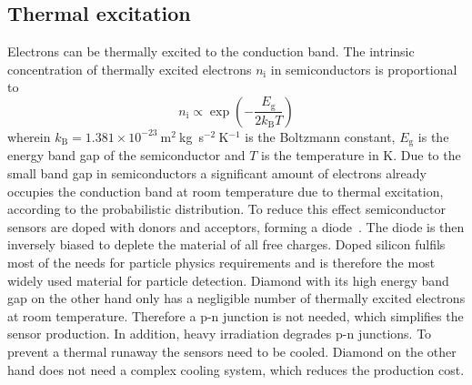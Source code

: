 \subsection{Thermal excitation}
Electrons can be thermally excited to the conduction band. The intrinsic concentration of thermally excited electrons $n_\mathrm{i}$ in semiconductors is proportional to~\cite{PHSEM:00000}
\begin{equation}
\label{eq:intrinsiccarrier}
n_\mathrm{i} \propto \exp\left(-\frac{E_\mathrm{g}}{2k_\mathrm{B}T}\right)
\end{equation} 
wherein $k_\mathrm{B} = 1.381\times10^{-23}~$m$^2~$kg~s$^{-2}~$K$^{-1}$ is the Boltzmann constant, $E_\mathrm{g}$ is the energy band gap of the semiconductor and $T$ is the temperature in K.
Due to the small band gap in semiconductors a significant amount of electrons already occupies the conduction band at room temperature due to thermal excitation, according to the probabilistic distribution. To reduce this effect semiconductor sensors are doped with donors and acceptors, forming a diode~\cite{PHSEM:00000}. The diode is then inversely biased to deplete the material of all free charges. Doped silicon fulfils most of the needs for particle physics requirements and is therefore the most widely used material for particle detection. Diamond with its high energy band gap on the other hand only has a negligible number of thermally excited electrons at room temperature. Therefore a p-n junction is not needed, which simplifies the sensor production. In addition, heavy irradiation degrades p-n junctions. To prevent a thermal runaway the sensors need to be cooled. Diamond on the other hand does not need a complex cooling system, which reduces the production cost.

 

